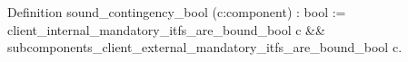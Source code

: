 Definition sound_contingency_bool (c:component) : bool :=
 client_internal_mandatory_itfs_are_bound_bool c &&
 subcomponents_client_external_mandatory_itfs_are_bound_bool c.

